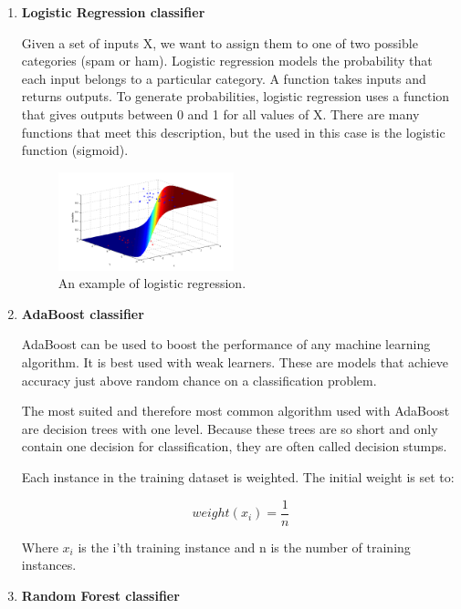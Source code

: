 \documentclass[journal]{IEEEtran}
\begin{document}
\begin{enumerate}
\item \textbf{Logistic Regression classifier}

Given a set of inputs X, we want to assign them to one of two possible categories (spam or ham). Logistic regression models the probability that each input belongs to a particular category. A function takes inputs and returns outputs. To generate probabilities, logistic regression uses a function that gives outputs between 0 and 1 for all values of X. There are many functions that meet this description, but the used in this case is the logistic function (sigmoid).

\begin{figure}[!h]
\begin{center}
\includegraphics[width=2in]{fig2.png}
\caption{An example of logistic regression. \cite{temp1}}
\end{center}\label{fig:mypicture}
\end{figure}


\item \textbf{AdaBoost classifier}

AdaBoost can be used to boost the performance of any machine learning algorithm. It is best used with weak learners. These are models that achieve accuracy just above random chance on a classification problem.

The most suited and therefore most common algorithm used with AdaBoost are decision trees with one level. Because these trees are so short and only contain one decision for classification, they are often called decision stumps.

Each instance in the training dataset is weighted. The initial weight is set to:

$$weight(x_i) = \frac{1}{n}$$

Where $x_{i}$ is the i’th training instance and n is the number of training instances.



\item \textbf{Random Forest classifier}


\end{enumerate}
\end{document}
